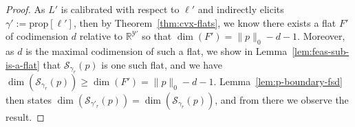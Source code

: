 \documentclass{article}
\newcommand{\reals}{\mathbb{R}}
\newcommand{\simplex}{\Delta_\Y}
\newcommand{\relint}[1]{\mathrm{relint}(#1)}
\newcommand{\prop}[1]{\mathrm{prop}[#1]}
\newcommand{\R}{\mathcal{R}}
\renewcommand{\S}{\mathcal{S}}
\newcommand{\Y}{\mathcal{Y}}
\begin{document}
\begin{proof}
	As $L'$ is calibrated with respect to $\ell'$ and indirectly elicits $\gamma' := \prop{\ell'}$, then by Theorem~\ref{thm:cvx-flats}, we know there exists a flat $F'$ of codimension $d$ relative to $\reals^{\Y'}$ so that $\dim(F') = \|p\|_0 - d - 1$.
	Moreover, as $d$ is the maximal codimension of such a flat, we show in Lemma~\ref{lem:feas-sub-is-a-flat} that $\S_{\gamma_r}(p)$ is one such flat, and we have $\dim(\S_{\gamma_r}(p)) \geq \dim(F') = \|p\|_0 - d- 1$.
	Lemma~\ref{lem:p-boundary-fsd} then states $\dim(\S_{\gamma'_r}(p)) = \dim(\S_{\gamma_r}(p))$, and from there we observe the result.
%
%	
%	
%
\end{proof}
\end{document}
